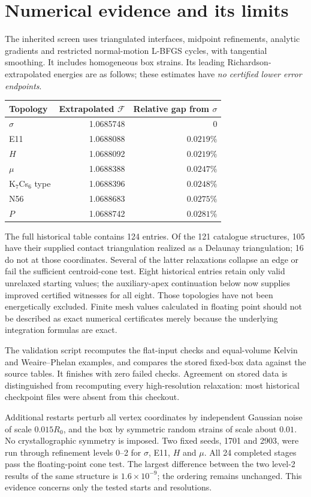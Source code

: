 \documentclass[11pt,a4paper]{report}
\newcommand{\DF}{\mathcal F}
\begin{document}
\section{Numerical evidence and its limits}

The inherited screen uses triangulated interfaces, midpoint refinements,
analytic gradients and restricted normal-motion L-BFGS cycles, with
tangential smoothing. It includes homogeneous box strains. Its leading
Richardson-extrapolated energies are as follows; these estimates have
\emph{no certified lower error endpoints}.
\begin{center}
\begin{tabular}{lrr}
\toprule
Topology & Extrapolated $\DF$ & Relative gap from $\sigma$\\
\midrule
$\sigma$ & 1.0685748 & 0\\
E11 & 1.0688088 & $0.0219\%$\\
$H$ & 1.0688092 & $0.0219\%$\\
$\mu$ & 1.0688388 & $0.0247\%$\\
K$_7$Cs$_6$ type & 1.0688396 & $0.0248\%$\\
N56 & 1.0688683 & $0.0275\%$\\
$P$ & 1.0688742 & $0.0281\%$\\
\bottomrule
\end{tabular}
\end{center}
The full historical table contains 124 entries. Of the 121 catalogue
structures, 105 have their supplied contact triangulation realized as a
Delaunay triangulation; 16 do not at those coordinates. Several of the
latter relaxations collapse an edge or fail the sufficient centroid-cone
test. Eight historical entries retain only valid unrelaxed starting values;
the auxiliary-apex continuation below now supplies improved certified
witnesses for all eight. Those topologies have not been energetically
excluded. Finite mesh values calculated in floating
point should not be described as exact numerical certificates merely
because the underlying integration formulas are exact.

The validation script recomputes the flat-input checks and equal-volume
Kelvin and Weaire--Phelan examples, and compares the stored fixed-box data
against the source tables. It finishes with zero failed checks. Agreement
on stored data is distinguished from recomputing every high-resolution
relaxation: most historical checkpoint files were absent from this checkout.

Additional restarts perturb all vertex coordinates by independent Gaussian
noise of scale $0.015R_0$, and the box by symmetric random strains of scale
about $0.01$. No crystallographic symmetry is imposed. Two fixed seeds,
1701 and 2903, were run through refinement levels 0--2 for $\sigma$, E11,
$H$ and $\mu$. All 24 completed stages pass the floating-point cone test.
The largest difference between the two level-2 results of the same
structure is $1.6\times10^{-9}$; the ordering remains unchanged. This
evidence concerns only the tested starts and resolutions.
\end{document}
